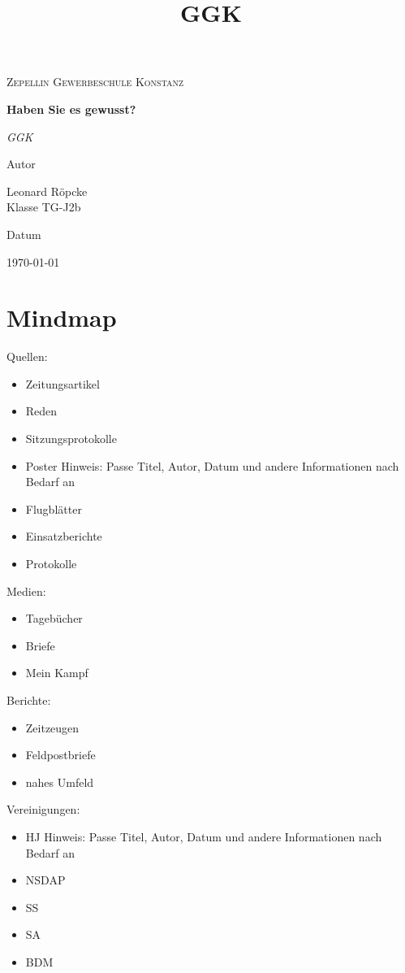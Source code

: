 \documentclass{article}
\title{GGK}
\newcommand{\AuthorName}{Leonard Röpcke\\Klasse TG-J2b}
\newcommand{\Institute}{Zepellin Gewerbeschule Konstanz}
\newcommand{\Subtitle}{GGK}
\newcommand{\MyDate}{\today}
\begin{document}
\begin{titlepage}
  \centering
  {\scshape\LARGE \Institute \par}
  \vspace{2.5cm}
  {\huge\bfseries Haben Sie es gewusst?\par}
  \vspace{0.8cm}
  {\Large\itshape \Subtitle \par}
  \vfill
  {\Large Autor\par}
  {\Large \AuthorName \par}
  \vspace{1cm}
  {\Large Datum\par}
  {\Large \MyDate \par}
  \vfill
  \vspace{1cm}
  {\small }
\end{titlepage}
\tableofcontents
\newpage

\section{Mindmap}
Quellen:
\begin{itemize}
    \item Zeitungsartikel
    \item Reden
    \item Sitzungsprotokolle
    \item Poster Hinweis: Passe Titel, Autor, Datum und andere Informationen nach Bedarf an
    \item Flugblätter
    \item Einsatzberichte
    \item Protokolle
\end{itemize}
Medien:
\begin{itemize}
    \item Tagebücher
    \item Briefe
    \item Mein Kampf
\end{itemize}
Berichte:
\begin{itemize}
    \item Zeitzeugen
    \item Feldpostbriefe
    \item nahes Umfeld
\end{itemize}
Vereinigungen:
\begin{itemize}
    \item HJ Hinweis: Passe Titel, Autor, Datum und andere Informationen nach Bedarf an
    \item NSDAP
    \item SS
    \item SA
    \item BDM
\end{itemize}
\end{document}
